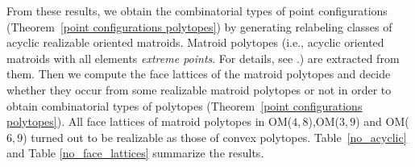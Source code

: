 \documentclass{article}
\begin{document}
From these results, we obtain the combinatorial types of point configurations (Theorem~\ref{point configurations polytopes})
by generating relabeling classes of acyclic realizable oriented matroids.
Matroid polytopes (i.e., acyclic oriented matroids with all elements {\it extreme points}. For details, see \cite{BLSWZ99}.) are extracted from them. 
Then we compute the face lattices of the matroid polytopes and decide whether they occur from
some realizable matroid polytopes or not in order to obtain combinatorial types of polytopes  (Theorem~\ref{point configurations polytopes}).
All face lattices of matroid polytopes in OM($4,8$),OM($3,9$) and OM($6,9$) turned out to be realizable as those of convex polytopes.
Table~\ref{no_acyclic} and Table \ref{no_face_lattices} summarize the results.
\\
%
%
\end{document}
